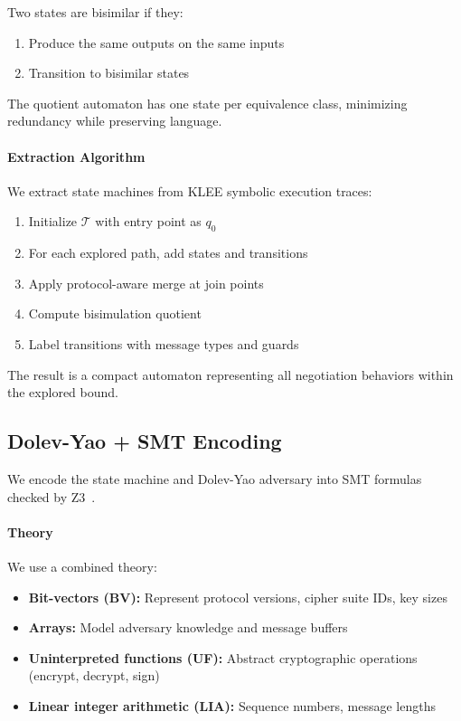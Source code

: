 \documentclass[10pt,twocolumn]{article}
\begin{document}
Two states are bisimilar if they:
\begin{enumerate}[leftmargin=*,noitemsep]
\item Produce the same outputs on the same inputs
\item Transition to bisimilar states
\end{enumerate}

The quotient automaton has one state per equivalence class, minimizing redundancy while preserving language.

\paragraph{Extraction Algorithm}
We extract state machines from KLEE symbolic execution traces:
\begin{enumerate}[leftmargin=*,noitemsep]
\item Initialize $\mathcal{T}$ with entry point as $q_0$
\item For each explored path, add states and transitions
\item Apply protocol-aware merge at join points
\item Compute bisimulation quotient
\item Label transitions with message types and guards
\end{enumerate}

The result is a compact automaton representing all negotiation behaviors within the explored bound.

\subsection{Dolev-Yao + SMT Encoding}
\label{sec:encoding}

We encode the state machine and Dolev-Yao adversary into SMT formulas checked by Z3~\cite{demoura2008z3}.

\paragraph{Theory}
We use a combined theory:
\begin{itemize}[leftmargin=*,noitemsep]
\item \textbf{Bit-vectors (BV):} Represent protocol versions, cipher suite IDs, key sizes
\item \textbf{Arrays:} Model adversary knowledge and message buffers
\item \textbf{Uninterpreted functions (UF):} Abstract cryptographic operations (encrypt, decrypt, sign)
\item \textbf{Linear integer arithmetic (LIA):} Sequence numbers, message lengths
\end{itemize}
\end{document}

